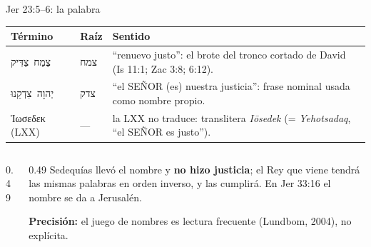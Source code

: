 \documentclass[hyperref={bookmarks=false},aspectratio=169]{beamer}
\newcommand{\heb}[1]{\mbox{\foreignlanguage{hebrew}{#1}}}
\newcommand{\grc}[1]{\foreignlanguage{ancientgreek}{#1}}
\newcommand{\SENOR}{S{\fontsize{0.78em}{1em}\selectfont EÑOR}}
\newcommand{\destacar}[1]{\textbf{\textcolor{azul}{#1}}}
\newcommand{\precision}[1]{{\footnotesize\color{gris}\textbf{Precisión:} #1}}
\begin{document}
\begin{frame}{Jer 23:5--6: la palabra}
\scriptsize\renewcommand{\arraystretch}{1.15}
\begin{tabular}{@{}>{\RaggedRight\arraybackslash}p{2.8cm}>{\RaggedRight\arraybackslash}p{1.1cm}>{\RaggedRight\arraybackslash}p{8.0cm}@{}}
\toprule
\textbf{Término} & \textbf{Raíz} & \textbf{Sentido} \\ \midrule
\heb{צֶמַח צַדִּיק} & \heb{צמח} & ``renuevo justo'': el brote del tronco cortado de David (Is 11:1; Zac 3:8; 6:12). \\
\heb{יְהוָה צִדְקֵנוּ} & \heb{צדק} & ``el \SENOR{} (es) nuestra justicia'': frase nominal usada como nombre propio. \\
\grc{Ἰωσεδεκ} (LXX) & --- & la LXX no traduce: translitera \emph{Iōsedek} (= \emph{Yehotsadaq}, ``el \SENOR{} es justo''). \\
\bottomrule
\end{tabular}\par\medskip
\begin{columns}[c,onlytextwidth]
\begin{column}{0.49\textwidth}
\centering
{}
\end{column}
\begin{column}{0.49\textwidth}\scriptsize
Sedequías llevó el nombre y \destacar{no hizo justicia}; el Rey que viene tendrá las mismas palabras en orden inverso, y las cumplirá. En Jer 33:16 el nombre se da a Jerusalén.\par
\precision{el juego de nombres es lectura frecuente (Lundbom, 2004), no explícita.}
\end{column}
\end{columns}
\end{frame}
\end{document}
